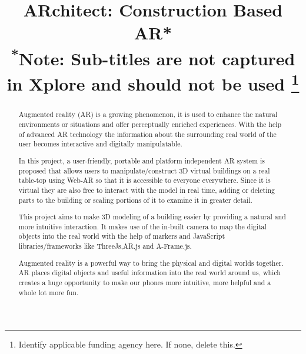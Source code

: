 \documentclass[conference]{IEEEtran}
\begin{document}
\title{ARchitect: Construction Based AR*\\
{\footnotesize \textsuperscript{*}Note: Sub-titles are not captured in Xplore and
should not be used}
\thanks{Identify applicable funding agency here. If none, delete this.}
}

\author{
\and
{}
\and
{}
\and
{}
}

\maketitle


\begin{abstract}
 Augmented reality (AR) is a growing phenomenon, it is used to enhance the natural environments 
 or situations and offer perceptually enriched experiences.
 With the help of advanced AR technology the information about the surrounding 
 real world of the user becomes interactive and digitally manipulatable.

In this project, a user-friendly, portable and platform independent AR system 
is proposed that allows users to manipulate/construct 3D virtual buildings on a
 real table-top using Web-AR so that it is accessible to everyone everywhere. Since
 it is virtual they are also free to interact with the model in real time, adding or 
 deleting parts to the building or scaling portions of it to examine it in greater detail. 

This project aims to make 3D modeling of a building easier by providing a
 natural and more intuitive interaction. It makes use of the in-built camera
 to map the digital objects into the real world with the help of markers and
 JavaScript libraries/frameworks like ThreeJs,AR.js and A-Frame.js.

 Augmented reality is a powerful way to bring the physical and digital worlds
 together. AR places digital objects and useful information into the real world 
 around us, which creates a huge opportunity to make our phones more intuitive, more helpful and a whole lot more fun.
\end{abstract}
\end{document}
